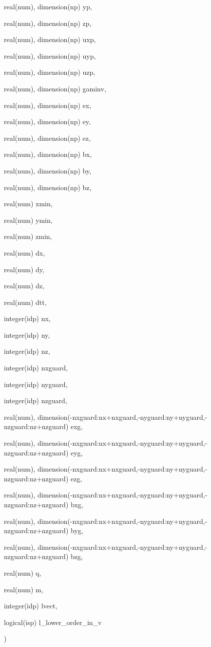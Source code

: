 {\begin{DoxyParamCaption}
\item[{real(num), dimension(np)}]{yp, }
\item[{real(num), dimension(np)}]{zp, }
\item[{real(num), dimension(np)}]{uxp, }
\item[{real(num), dimension(np)}]{uyp, }
\item[{real(num), dimension(np)}]{uzp, }
\item[{real(num), dimension(np)}]{gaminv, }
\item[{real(num), dimension(np)}]{ex, }
\item[{real(num), dimension(np)}]{ey, }
\item[{real(num), dimension(np)}]{ez, }
\item[{real(num), dimension(np)}]{bx, }
\item[{real(num), dimension(np)}]{by, }
\item[{real(num), dimension(np)}]{bz, }
\item[{real(num)}]{xmin, }
\item[{real(num)}]{ymin, }
\item[{real(num)}]{zmin, }
\item[{real(num)}]{dx, }
\item[{real(num)}]{dy, }
\item[{real(num)}]{dz, }
\item[{real(num)}]{dtt, }
\item[{integer(idp)}]{nx, }
\item[{integer(idp)}]{ny, }
\item[{integer(idp)}]{nz, }
\item[{integer(idp)}]{nxguard, }
\item[{integer(idp)}]{nyguard, }
\item[{integer(idp)}]{nzguard, }
\item[{real(num), dimension(-\/nxguard\+:nx+nxguard,-\/nyguard\+:ny+nyguard,-\/nzguard\+:nz+nzguard)}]{exg, }
\item[{real(num), dimension(-\/nxguard\+:nx+nxguard,-\/nyguard\+:ny+nyguard,-\/nzguard\+:nz+nzguard)}]{eyg, }
\item[{real(num), dimension(-\/nxguard\+:nx+nxguard,-\/nyguard\+:ny+nyguard,-\/nzguard\+:nz+nzguard)}]{ezg, }
\item[{real(num), dimension(-\/nxguard\+:nx+nxguard,-\/nyguard\+:ny+nyguard,-\/nzguard\+:nz+nzguard)}]{bxg, }
\item[{real(num), dimension(-\/nxguard\+:nx+nxguard,-\/nyguard\+:ny+nyguard,-\/nzguard\+:nz+nzguard)}]{byg, }
\item[{real(num), dimension(-\/nxguard\+:nx+nxguard,-\/nyguard\+:ny+nyguard,-\/nzguard\+:nz+nzguard)}]{bzg, }
\item[{real(num)}]{q, }
\item[{real(num)}]{m, }
\item[{integer(idp)}]{lvect, }
\item[{logical(isp)}]{l\+\_\+lower\+\_\+order\+\_\+in\+\_\+v}
\end{DoxyParamCaption}
)}\hypertarget{particles__push_8_f90_ac04a46dfecd1ade015d3bf1ff801159a}{}\label{particles__push_8_f90_ac04a46dfecd1ade015d3bf1ff801159a}
